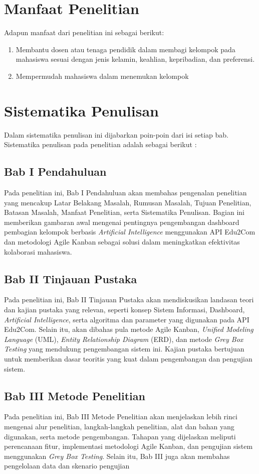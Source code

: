 \section{Manfaat Penelitian} \label{I.Manfaat}
Adapun manfaat dari penelitian ini sebagai berikut:

\begin{enumerate}
	\item Membantu dosen atau tenaga pendidik dalam membagi kelompok pada
	      mahasiswa sesuai dengan jenis kelamin, keahlian, kepribadian, dan preferensi.
	\item Mempermudah mahasiswa dalam menemukan kelompok
\end{enumerate}

\section{Sistematika Penulisan} \label{I.Sistematika}
Dalam sistematika penulisan ini dijabarkan poin-poin dari isi setiap bab.
Sistematika penulisan pada penelitian adalah sebagai berikut :

\subsection{Bab I Pendahuluan}
Pada penelitian ini, Bab I Pendahuluan akan membahas pengenalan penelitian yang
mencakup Latar Belakang Masalah, Rumusan Masalah, Tujuan Penelitian, Batasan
Masalah, Manfaat Penelitian, serta Sistematika Penulisan. Bagian ini memberikan
gambaran awal mengenai pentingnya pengembangan dashboard pembagian kelompok
berbasis \textit{Artificial Intelligence} menggunakan API Edu2Com dan
metodologi Agile Kanban sebagai solusi dalam meningkatkan efektivitas
kolaborasi mahasiswa.

\subsection{Bab II Tinjauan Pustaka}
Pada penelitian ini, Bab II Tinjauan Pustaka akan mendiskusikan landasan teori
dan kajian pustaka yang relevan, seperti konsep Sistem Informasi, Dashboard,
\textit{Artificial Intelligence}, serta algoritma dan parameter yang digunakan
pada API Edu2Com. Selain itu, akan dibahas pula metode Agile Kanban,
\textit{Unified Modeling Language} (UML), \textit{Entity Relationship Diagram}
(ERD), dan metode \textit{Grey Box Testing} yang mendukung pengembangan sistem
ini. Kajian pustaka bertujuan untuk memberikan dasar teoritis yang kuat dalam
pengembangan dan pengujian sistem.

\subsection{Bab III Metode Penelitian}
Pada penelitian ini, Bab III Metode Penelitian akan menjelaskan lebih rinci
mengenai alur penelitian, langkah-langkah penelitian, alat dan bahan yang
digunakan, serta metode pengembangan. Tahapan yang dijelaskan meliputi
perencanaan fitur, implementasi metodologi Agile Kanban, dan pengujian sistem
menggunakan \textit{Grey Box Testing}. Selain itu, Bab III juga akan membahas
pengelolaan data dan skenario pengujian
